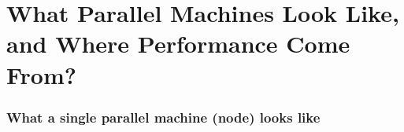 \documentclass[12pt,dvipdfmx]{beamer}
\begin{document}
\section{What Parallel Machines Look Like, and Where Performance Come From?}

\begin{frame}
\frametitle{What a single parallel machine (node) looks like}
\begin{columns}
\begin{column}{0.4\textwidth}
\begin{center}
%

\end{center}
\end{column}
\end{columns}
\end{frame}
\end{document}
